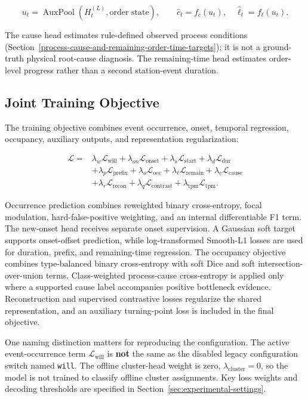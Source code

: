\[
u_t=\operatorname{AuxPool}(H_t^{(L)},\text{order state}),\qquad
\hat c_t=f_c(u_t),\quad\hat\ell_t=f_\ell(u_t).
\]

The cause head estimates rule-defined observed process conditions (Section~\ref{process-cause-and-remaining-order-time-targets}); it is not a ground-truth physical root-cause diagnosis. The remaining-time head estimates order-level progress rather than a second station-event duration.

\subsection{Joint Training Objective}\label{joint-training-objective}

The training objective combines event occurrence, onset, temporal regression, occupancy, auxiliary outputs, and representation regularization:

\[
\begin{aligned}
\mathcal{L}={}&\lambda_w\mathcal{L}_{\mathrm{will}}+\lambda_{on}\mathcal{L}_{\mathrm{onset}}+
\lambda_s\mathcal{L}_{\mathrm{start}}+\lambda_d\mathcal{L}_{\mathrm{dur}}\\
&+\lambda_p\mathcal{L}_{\mathrm{prefix}}+\lambda_o\mathcal{L}_{\mathrm{occ}}+
\lambda_{\ell}\mathcal{L}_{\mathrm{remain}}+\lambda_c\mathcal{L}_{\mathrm{cause}}\\
&+\lambda_r\mathcal{L}_{\mathrm{recon}}+\lambda_q\mathcal{L}_{\mathrm{contrast}}+
\lambda_{\mathrm{tpm}}\mathcal{L}_{\mathrm{tpm}}.
\end{aligned}
\]

Occurrence prediction combines reweighted binary cross-entropy, focal modulation, hard-false-positive weighting, and an internal differentiable F1 term. The new-onset head receives separate onset supervision. A Gaussian soft target supports onset-offset prediction, while log-transformed Smooth-L1 losses are used for duration, prefix, and remaining-time regression. The occupancy objective combines type-balanced binary cross-entropy with soft Dice and soft intersection-over-union terms. Class-weighted process-cause cross-entropy is applied only where a supported cause label accompanies positive bottleneck evidence. Reconstruction and supervised contrastive losses regularize the shared representation, and an auxiliary turning-point loss is included in the final objective.

One naming distinction matters for reproducing the configuration. The active event-occurrence term \(\mathcal{L}_{\mathrm{will}}\) is \textbf{not} the same as the disabled legacy configuration switch named \texttt{will}. The offline cluster-head weight is zero, \(\lambda_{\mathrm{cluster}}=0\), so the model is not trained to classify offline cluster assignments. Key loss weights and decoding thresholds are specified in Section~\ref{sec:experimental-settings}.

